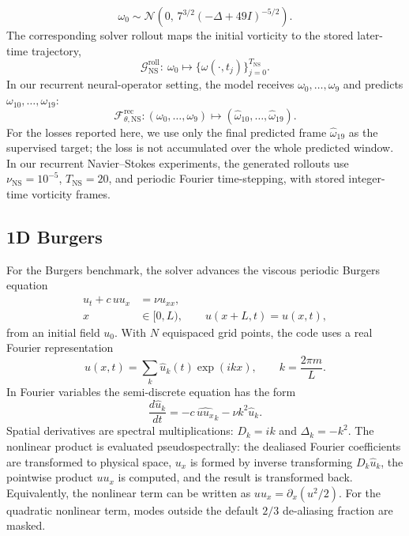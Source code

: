 \begin{equation}
  \omega_0
  \sim
  \mathcal{N}
  \!\left(
    0,\,
    7^{3/2}(-\Delta+49I)^{-5/2}
  \right).
\end{equation}
The corresponding solver rollout maps the initial vorticity to the stored
later-time trajectory,
\begin{equation}
  \mathcal{G}_{\mathrm{NS}}^{\mathrm{roll}}:\ \omega_0
  \mapsto
  \{\omega(\cdot,t_j)\}_{j=0}^{T_{\mathrm{NS}}}.
\end{equation}
In our recurrent neural-operator setting, the model receives
$\omega_0,\ldots,\omega_9$ and predicts
$\omega_{10},\ldots,\omega_{19}$:
\begin{equation}
  \mathcal F_{\theta,\mathrm{NS}}^{\mathrm{rec}}:
  (\omega_0,\ldots,\omega_9)
  \mapsto
  (\widehat\omega_{10},\ldots,\widehat\omega_{19}).
\end{equation}
For the losses reported here, we use only the final predicted frame
$\widehat\omega_{19}$ as the supervised target; the loss is not accumulated
over the whole predicted window.
In our recurrent Navier--Stokes experiments, the generated rollouts use
$\nu_{\mathrm{NS}}=10^{-5}$, $T_{\mathrm{NS}}=20$, and periodic Fourier
time-stepping, with stored integer-time vorticity frames.

\clearpage
{}
\vspace{0.4em}

\subsection*{1D Burgers}

For the Burgers benchmark, the solver advances the viscous periodic Burgers
equation
\begin{align}
  u_t + c\,u u_x &= \nu u_{xx},
  \nonumber\\
  x&\in[0,L),\qquad u(x+L,t)=u(x,t),
\end{align}
from an initial field $u_0$. With $N$ equispaced grid points, the code uses a
real Fourier representation
\begin{equation}
  u(x,t)=\sum_k \hat u_k(t)\exp(i k x),
  \qquad k = \frac{2\pi m}{L}.
\end{equation}
In Fourier variables the semi-discrete equation has the form
\begin{equation}
  \frac{d\hat u_k}{dt}
  =
  -c\,\widehat{u u_x}_k
  -\nu k^2 \hat u_k .
\end{equation}
Spatial derivatives are spectral multiplications: $D_k=i k$ and
$\Delta_k=-k^2$. The nonlinear product is evaluated pseudospectrally: the
dealiased Fourier coefficients are transformed to physical space, $u_x$ is
formed by inverse transforming $D_k\hat u_k$, the pointwise product $u u_x$ is
computed, and the result is transformed back. Equivalently, the nonlinear term
can be written as $u u_x=\partial_x(u^2/2)$.
For the quadratic nonlinear term, modes outside the default $2/3$ de-aliasing
fraction are masked.

